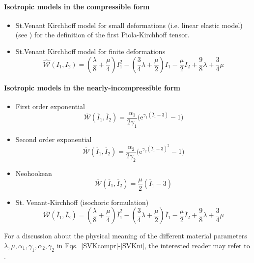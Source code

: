 \documentclass[a4paper, 10pt,twoside]{article}
\theoremstyle{plain}
\theoremstyle{definition}
\theoremstyle{remark}
\newcommand{\WeNT}{\widehat{\mathcal{W}}}
\newcommand{\isoWe}{\overline{\mathcal{W}}}
\begin{document}
\paragraph{Isotropic models in the compressible form}
\begin{itemize}
\item St.Venant Kirchhoff model for small deformations (i.e. linear elastic model) (see \cite{thesis::Crosetto}) for the definition of the first Piola-Kirchhoff tensor.
\item St.Venant Kirchhoff model for finite deformations
  \begin{equation}
    \displaystyle \WeNT \left(I_1,I_2\right) = \left( \frac{\lambda}{8} + \frac{\mu}{4} \right)I_1^2 - \left( \frac{3}{4}\lambda + \frac{\mu}{2} \right)I_1 - \frac{\mu}{2}I_2 + \frac{9}{8}\lambda + \frac{3}{4}\mu
    \label{SVKcompr}
  \end{equation}
\end{itemize}
\paragraph{Isotropic models in the nearly-incompressible form}
\begin{itemize}
\item First order exponential
  \begin{equation}
    \displaystyle \isoWe\left( \overline{I}_1, \overline{I}_2\right) = \displaystyle \frac{\alpha_1}{2\gamma_1}\bigg( \text{e}^{\gamma_1( \overline{I}_1-3)} - 1\bigg)
        \end{equation}
\item Second order exponential
  \begin{equation}
    \displaystyle \isoWe\left( \overline{I}_1, \overline{I}_2\right) = \displaystyle  \frac{\alpha_2}{2\gamma_2}\bigg( \text{e}^{\gamma_2( \overline{I}_1-3)^2} - 1\bigg)
  \end{equation}
\item Neohookean
  \begin{equation}
    \displaystyle \isoWe\left( \overline{I}_1, \overline{I}_2\right) = \displaystyle \frac{\mu}{2}\left( \overline{I}_1 - 3 \right)
  \end{equation}
\item St. Venant-Kirchhoff (isochoric formulation)
  \begin{equation}
    \displaystyle \isoWe\left( \overline{I}_1, \overline{I}_2\right) = \displaystyle \left( \frac{\lambda}{8} + \frac{\mu}{4} \right)\overline{I}_1^2 - \left( \frac{3}{4}\lambda + \frac{\mu}{2} \right)\overline{I}_1 - \frac{\mu}{2}\overline{I}_2 + \frac{9}{8}\lambda + \frac{3}{4}\mu
    \label{SVKni}
  \end{equation}
\end{itemize}
For a discussion about the physical meaning of the different material parameters $\lambda,\mu,\alpha_1,\gamma_1,\alpha_2,\gamma_2$ in Eqs.~\eqref{SVKcompr}-\eqref{SVKni}, the interested reader may refer to \cite{book::Holzapfel2000}.
\end{document}
